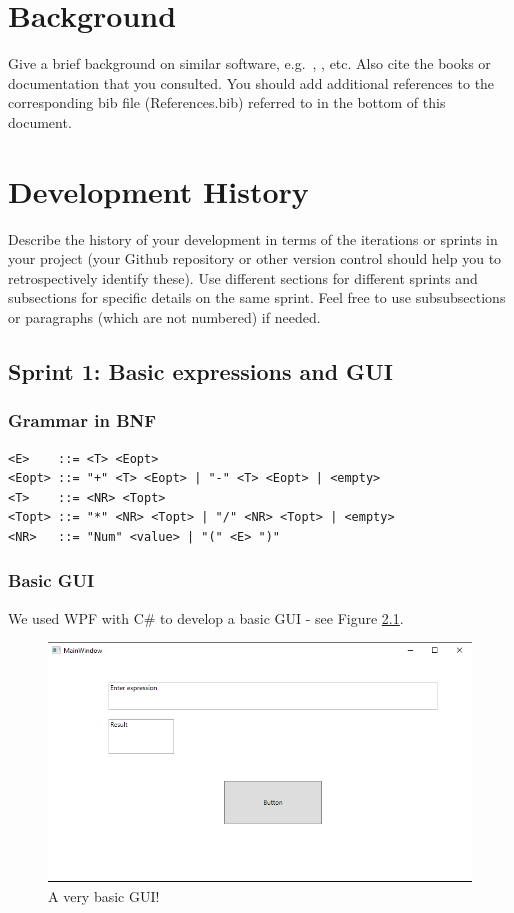 \documentclass[a4paper, oneside, 11pt]{report}
\begin{document}
\chapter{Background}

Give a brief background on similar software, e.g.\ \cite{Desmos:2023}, \cite{Matlab:2023}, etc.
Also cite the books \cite{Nystrom:2021} or documentation \cite{WPF:2023} that you consulted.
You should add additional references to the corresponding bib file (References.bib) referred to in the bottom of this document.


\chapter{Development History}\label{Chap:DevHist}

Describe the history of your development in terms of the iterations or sprints in your project (your Github repository or other version control should help you to retrospectively identify these). Use different sections for different sprints and subsections for specific details on the same sprint. Feel free to use subsubsections or paragraphs (which are not numbered) if needed. 

\section{Sprint 1: Basic expressions and GUI}
\subsection{Grammar in BNF}
\begin{verbatim}
<E>    ::= <T> <Eopt>
<Eopt> ::= "+" <T> <Eopt> | "-" <T> <Eopt> | <empty>
<T>    ::= <NR> <Topt>
<Topt> ::= "*" <NR> <Topt> | "/" <NR> <Topt> | <empty>
<NR>   ::= "Num" <value> | "(" <E> ")"
\end{verbatim}

\subsection{Basic GUI}
We used WPF with C\# to develop a basic GUI - see Figure \ref{gui01}.

\begin{figure}[htb]
\begin{center}
\includegraphics[width=0.9 \columnwidth]{GUI_01.png}
\caption{A very basic GUI!}
\label{gui01}
\end{center}
\end{figure}
\end{document}
